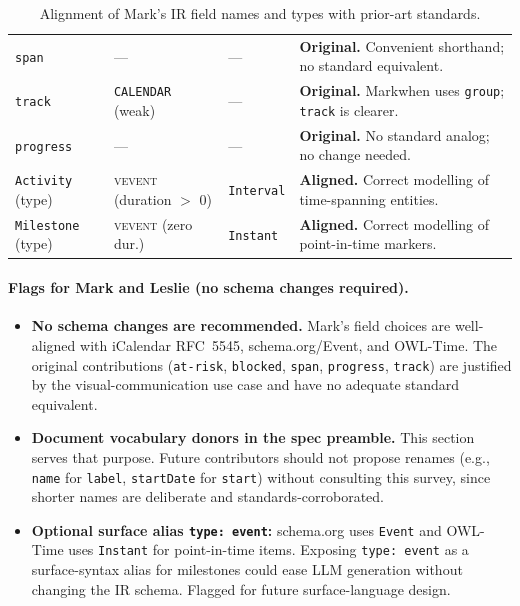 \begin{table}[h]
\begin{tabular}{p{2.4cm}p{3.0cm}p{2.0cm}p{4.0cm}}
\texttt{span}
  & ---
  & ---
  & \textbf{Original.} Convenient shorthand; no standard equivalent. \\
\texttt{track}
  & \texttt{CALENDAR} (weak)
  & ---
  & \textbf{Original.} Markwhen uses \texttt{group}; \texttt{track} is clearer. \\
\texttt{progress}
  & ---
  & ---
  & \textbf{Original.} No standard analog; no change needed. \\
\texttt{Activity} (type)
  & \textsc{vevent} (duration $>$ 0)
  & \texttt{Interval}
  & \textbf{Aligned.} Correct modelling of time-spanning entities. \\
\texttt{Milestone} (type)
  & \textsc{vevent} (zero dur.)
  & \texttt{Instant}
  & \textbf{Aligned.} Correct modelling of point-in-time markers. \\
\bottomrule
\end{tabular}
\caption{Alignment of Mark's IR field names and types with prior-art standards.}
\label{tab:alignment}
\end{table}

\paragraph{Flags for Mark and Leslie (no schema changes required).}
\begin{itemize}
  \item \textbf{No schema changes are recommended.} Mark's field choices are
        well-aligned with iCalendar RFC~5545, schema.org/Event, and OWL-Time.
        The original contributions (\texttt{at-risk}, \texttt{blocked},
        \texttt{span}, \texttt{progress}, \texttt{track}) are justified by the
        visual-communication use case and have no adequate standard equivalent.

  \item \textbf{Document vocabulary donors in the spec preamble.} This section
        serves that purpose. Future contributors should not propose renames (e.g.,
        \texttt{name} for \texttt{label}, \texttt{startDate} for \texttt{start})
        without consulting this survey, since shorter names are deliberate and
        standards-corroborated.

  \item \textbf{Optional surface alias \texttt{type: event}:} schema.org uses
        \texttt{Event} and OWL-Time uses \texttt{Instant} for point-in-time
        items. Exposing \texttt{type: event} as a surface-syntax alias for
        milestones could ease LLM generation without changing the IR schema.
        Flagged for future surface-language design.
\end{itemize}

